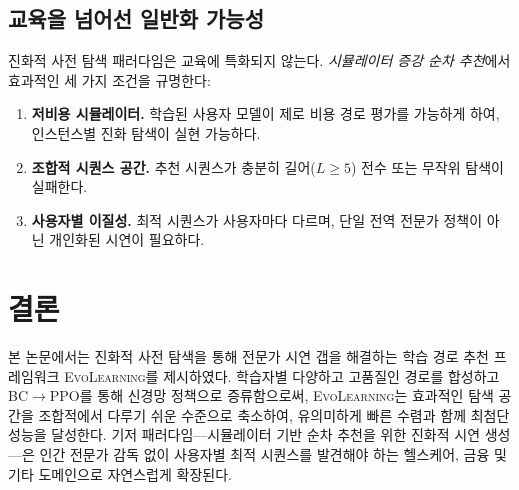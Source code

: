 \documentclass[11pt,a4paper]{article}
\newcommand{\ours}{\textsc{EvoLearning}}
\begin{document}
\subsection{교육을 넘어선 일반화 가능성}

진화적 사전 탐색 패러다임은 교육에 특화되지 않는다. \emph{시뮬레이터 증강 순차 추천}에서 효과적인 세 가지 조건을 규명한다:
\begin{enumerate}
    \item \textbf{저비용 시뮬레이터.} 학습된 사용자 모델이 제로 비용 경로 평가를 가능하게 하여, 인스턴스별 진화 탐색이 실현 가능하다.
    \item \textbf{조합적 시퀀스 공간.} 추천 시퀀스가 충분히 길어($L \geq 5$) 전수 또는 무작위 탐색이 실패한다.
    \item \textbf{사용자별 이질성.} 최적 시퀀스가 사용자마다 다르며, 단일 전역 전문가 정책이 아닌 개인화된 시연이 필요하다.
\end{enumerate}

\section{결론}

본 논문에서는 진화적 사전 탐색을 통해 전문가 시연 갭을 해결하는 학습 경로 추천 프레임워크 \ours{}를 제시하였다. 학습자별 다양하고 고품질인 경로를 합성하고 BC$\to$PPO를 통해 신경망 정책으로 증류함으로써, \ours{}는 효과적인 탐색 공간을 조합적에서 다루기 쉬운 수준으로 축소하여, 유의미하게 빠른 수렴과 함께 최첨단 성능을 달성한다. 기저 패러다임---시뮬레이터 기반 순차 추천을 위한 진화적 시연 생성---은 인간 전문가 감독 없이 사용자별 최적 시퀀스를 발견해야 하는 헬스케어, 금융 및 기타 도메인으로 자연스럽게 확장된다.
\end{document}
